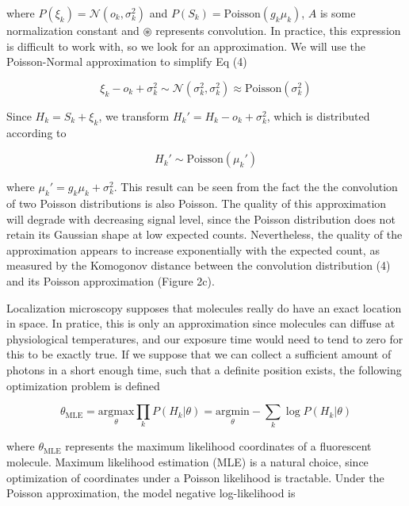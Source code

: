 \documentclass{ucetd}
\begin{document}
where $P(\xi_{k}) = \mathcal{N}(o_{k},\sigma_{k}^{2})$ and $P(S_{k}) = \mathrm{Poisson}(g_{k}\mu_{k})$,  $A$ is some normalization constant and $\circledast$ represents convolution. In practice, this expression is difficult to work with, so we look for an approximation. We will use the Poisson-Normal approximation to simplify Eq (4)

\begin{equation*}
\xi_{k} - o_{k} + \sigma_{k}^{2} \sim \mathcal{N}(\sigma_{k}^{2},\sigma_{k}^{2}) \approx \mathrm{Poisson}(\sigma_{k}^{2})
\end{equation*}

Since $H_{k} = S_{k} + \xi_{k}$, we transform $H_{k}' = H_{k} - o_{k} + \sigma_{k}^{2}$, which is distributed according to 

\begin{equation*}
H_{k}' \sim \mathrm{Poisson}(\mu_{k}')
\end{equation*}

where $\mu_{k}' = g_{k}\mu_{k} + \sigma_{k}^{2}$. This result can be seen from the fact the the convolution of two Poisson distributions is also Poisson. The quality of this approximation will degrade with decreasing signal level, since the Poisson distribution does not retain its Gaussian shape at low expected counts. Nevertheless, the quality of the approximation appears to increase exponentially with the expected count, as measured by the Komogonov distance between the convolution distribution (4) and its Poisson approximation (Figure 2c).

Localization microscopy supposes that molecules really do have an exact location in space. In pratice, this is only an approximation since molecules can diffuse at physiological temperatures, and our exposure time would need to tend to zero for this to be exactly true. If we suppose that we can collect a sufficient amount of photons in a short enough time, such that a definite position exists, the following optimization problem is defined

\begin{equation*}
\theta_{\mathrm{MLE}} = \underset{\theta}{\mathrm{argmax}}\prod_{k}P(H_{k}|\theta)= \underset{\theta}{\mathrm{argmin}}-\sum_{k}\log P(H_{k}|\theta)
\end{equation*}


where $\theta_{\mathrm{MLE}}$ represents the maximum likelihood coordinates of a fluorescent molecule. Maximum likelihood estimation (MLE) is a natural choice, since optimization of coordinates under a Poisson likelihood is tractable. Under the Poisson approximation, the model negative log-likelihood is
\end{document}
